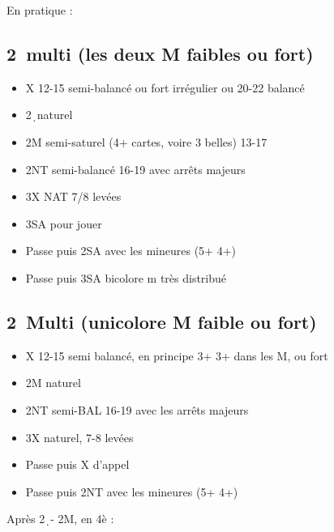 \documentclass[a4paper]{article}
\begin{document}
En pratique :

\subsection{2\pdfc\ multi (les deux M faibles ou fort)}

\begin{itemize}
\item X 12-15 semi-balancé ou fort irrégulier ou 20-22 balancé

\item 2\d\ naturel

\item 2M semi-saturel (4+ cartes, voire 3 belles) 13-17

\item 2NT semi-balancé 16-19 avec arrêts majeurs

\item 3X NAT 7/8 levées

\item 3SA pour jouer

\item Passe puis 2SA avec les mineures (5+ 4+)

\item Passe puis 3SA bicolore m très distribué

\end{itemize}

\subsection{2\pdfd\ Multi (unicolore M faible ou fort)}

\begin{itemize}
\item X 12-15 semi balancé, en principe 3+ 3+ dans les M, ou fort

\item 2M naturel

\item 2NT semi-BAL 16-19 avec les arrêts majeurs

\item 3X naturel, 7-8 levées

\item Passe puis X d'appel

\item Passe puis 2NT avec les mineures (5+ 4+)

\end{itemize}

Après 2\d\ - 2M, en 4è :
\end{document}
